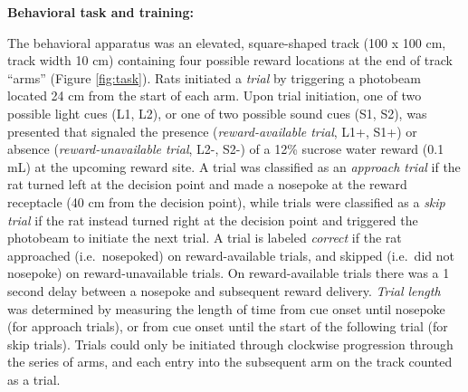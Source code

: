 \documentclass[11pt]{article}
\begin{document}
{\bf Behavioral task and training:}

The behavioral apparatus was an elevated, square-shaped track (100 x
100 cm, track width 10 cm) containing four possible reward locations
at the end of track ``arms'' (Figure \ref{fig:task}). Rats initiated a
{\it trial} by triggering a photobeam located 24 cm from the start of
each arm. Upon trial initiation, one of two possible light cues (L1,
L2), or one of two possible sound cues (S1, S2), was presented that
signaled the presence ({\it reward-available trial}, L1+, S1+) or
absence ({\it reward-unavailable trial}, L2-, S2-) of a 12\% sucrose
water reward (0.1 mL) at the upcoming reward site. A trial was
classified as an {\it approach trial} if the rat turned left at the
decision point and made a nosepoke at the reward receptacle (40 cm
from the decision point), while trials were classified as a {\it skip
trial} if the rat instead turned right at the decision point and
triggered the photobeam to initiate the next trial. A trial is labeled
{\it correct} if the rat approached (i.e.\ nosepoked) on
reward-available trials, and skipped (i.e.\ did not nosepoke) on
reward-unavailable trials. On reward-available trials there was a 1
second delay between a nosepoke and subsequent reward delivery. {\it
Trial length} was determined by measuring the length of time from
cue onset until nosepoke (for approach trials), or from cue onset
until the start of the following trial (for skip trials). Trials could
only be initiated through clockwise progression through the series of
arms, and each entry into the subsequent arm on the track counted as a
trial.
\end{document}
